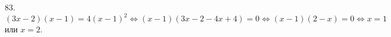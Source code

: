 83. $(3x-2)(x-1)=4(x-1)^2\Leftrightarrow (x-1)(3x-2-4x+4)=0\Leftrightarrow (x-1)(2-x)=0\Leftrightarrow x=1$ или $x=2.$\\
